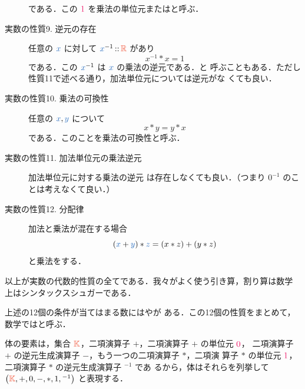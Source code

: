 \documentclass[a5paper,twoside,fleqn,draft]{jsbook}
\begin{document}
\begin{description}
である．この $\hConstant{1}$ を乗法の単位元またはと呼ぶ．
\item[実数の性質9. 逆元の存在] 任意の $\hVar{x}$ に対して $\hVar{x}^{-1}\mIn\mRSet$
があり
\begin{equation}
x^{-1}*x=1
\end{equation}
である．この $\hVar{x}^{-1}$ は $\hVar{x}$ の乗法の逆元である．と
呼ぶこともある．ただし性質11で述べる通り，加法単位元については逆元がな
くても良い．
\item[実数の性質10. 乗法の可換性] 任意の $\hVar{x},\hVar{y}$ について
\begin{equation}
x*y=y*x
\end{equation}
である．このことを乗法の可換性と呼ぶ．
\item[実数の性質11. 加法単位元の乗法逆元] 加法単位元に対する乗法の逆元
は存在しなくても良い．（つまり $0^{-1}$ のことは考えなくて良い．）
\item[実数の性質12. 分配律] 加法と乗法が混在する場合
\begin{equation}
(\hVar{x}+\hVar{y})*\hVar{z}=(x*z)+(y*z)
\end{equation}
と乗法をする．
\end{description}
以上が実数の代数的性質の全てである．我々がよく使う引き算，割り算は数学
上はシンタックスシュガーである．

上述の12個の条件が当てはまる数にはやが
ある．この12個の性質をまとめて，数学ではと呼ぶ．

体の要素は，集合 $\mKSet$，二項演算子 $+$，二項演算子 $+$ の単位元 $\hConstant{0}$，
二項演算子 $+$ の逆元生成演算子 $-$，もう一つの二項演算子 $*$，二項演
算子 $*$ の単位元 $\hConstant{1}$，二項演算子 $*$ の逆元生成演算子 ${}^{-1}$ であ
るから，体はそれらを列挙して $\mTupleWith{\mKSet,+,0,-,*,1,{}^{-1}}$
と表現する．
\end{document}
